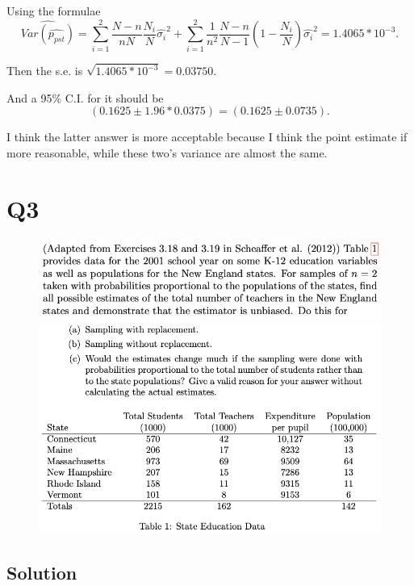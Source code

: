 \documentclass[12pt]{article}%
\begin{document}
Using the formulae 
$$\widehat{Var(\widehat{p_{pst}})}=\sum_{i=1}^{2}\frac{N-n}{nN}\frac{N_i}{N} \hat{\sigma_i}^2
+ \sum_{i=1}^2 \frac{1}{n^2}\frac{N-n}{N-1}(1-\frac{N_i}{N})\hat{\sigma_i}^2=1.4065*10^{-3}.$$

Then the s.e. is $\sqrt{1.4065*10^{-3}}=0.03750.$ 

And a 95\% C.I. for it should be $$(0.1625 \pm 1.96*0.0375) = (0.1625 \pm 0.0735).$$

I think the latter answer is more acceptable because I think the point estimate if more reasonable, 
while these two's variance are almost the same.


\newpage
\section{Q3}
\begin{figure}[htp]
    \includegraphics[width = 15cm]{img/Q3(1).png}
    \includegraphics[width = 15cm]{img/Q3(2).png}
\end{figure}
\subsection*{Solution}
\end{document}
